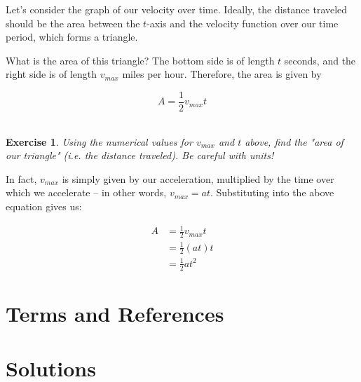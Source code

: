 \documentclass{book}
\newtheorem{exercise}{\\ \bf Exercise}
\begin{document}
Let's consider the graph of our velocity over time. Ideally, the distance traveled should be the area between the $t$-axis and the velocity function over our time period, which forms a triangle. 


What is the area of this triangle? The bottom side is of length $t$ seconds, and the right side is of length $v_{max}$ miles per hour. Therefore, the area is given by 

\begin{equation}
A = \frac{1}{2} v_{max} t
\end{equation}


\begin{exercise}
\label{const-velocity-numerical}
Using the numerical values for $v_{max}$ and $t$ above, find the "area of our triangle" (i.e. the distance traveled). Be careful with units!
\end{exercise}

In fact, $v_{max}$ is simply given by our acceleration, multiplied by the time over which we accelerate -- in other words, $v_{max} = at$. Substituting into the above equation gives us:

\begin{align*}
A &= \frac{1}{2} v_{max} t \\
&= \frac{1}{2} (a t) t \\
&= \frac{1}{2} a t^2
\end{align*}
















\section{Terms and References}

\section{Solutions}
\end{document}
